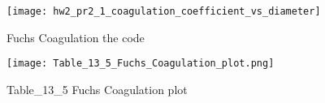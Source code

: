 \documentclass[12pt]{article}
\begin{document}
\begin{figure}\label{fig:problem-2-a-1}
\begin{center}
\texttt{[image: hw2\_pr2\_1\_coagulation\_coefficient\_vs\_diameter]}
\caption{Fuchs Coagulation the code}
\end{center}
\end{figure}

\begin{figure}\label{fig:problem-2-a-2}
\begin{center}
\texttt{[image: Table\_13\_5\_Fuchs\_Coagulation\_plot.png]}
\caption{Table\_13\_5 Fuchs Coagulation plot}
\end{center}
\end{figure}
\end{document}
